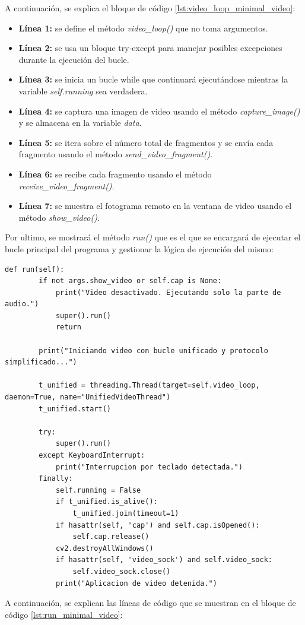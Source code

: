 \vspace{\baselineskip}
A continuación, se explica el bloque de código \ref{lst:video_loop_minimal_video}:
\vspace{\baselineskip}
\begin{itemize}
    \item \textbf{Línea 1:} se define el método \textit{video\_loop()} que no toma argumentos.
    \item \textbf{Línea 2:} se usa un bloque try-except para manejar posibles excepciones durante la ejecución del bucle.
    \item \textbf{Línea 3:} se inicia un bucle while que continuará ejecutándose mientras la variable \textit{self.running} sea verdadera.
    \item \textbf{Línea 4:} se captura una imagen de video usando el método \textit{capture\_image()} y se almacena en la variable \textit{data}.
    \item \textbf{Línea 5:} se itera sobre el número total de fragmentos y se envía cada fragmento usando el método \textit{send\_video\_fragment()}.
    \item \textbf{Línea 6:} se recibe cada fragmento usando el método \textit{receive\_video\_fragment()}.
    \item \textbf{Línea 7:} se muestra el fotograma remoto en la ventana de video usando el método \textit{show\_video()}.
\end{itemize}

\vspace{\baselineskip}

Por ultimo, se mostrará el método \textit{run()} que es el que se encargará de ejecutar el bucle principal del programa y gestionar la lógica de ejecución del mismo:
\begin{lstlisting}[style=pythonstyle, caption={Método run() de \textit{Minimal\_Video}}, label={lst:run_minimal_video}]
def run(self):
        if not args.show_video or self.cap is None:
            print("Video desactivado. Ejecutando solo la parte de audio.")
            super().run()
            return

        print("Iniciando video con bucle unificado y protocolo simplificado...")

        t_unified = threading.Thread(target=self.video_loop, daemon=True, name="UnifiedVideoThread")
        t_unified.start()

        try:
            super().run()
        except KeyboardInterrupt:
            print("Interrupcion por teclado detectada.")
        finally:
            self.running = False
            if t_unified.is_alive():
                t_unified.join(timeout=1)
            if hasattr(self, 'cap') and self.cap.isOpened():
                self.cap.release()
            cv2.destroyAllWindows()
            if hasattr(self, 'video_sock') and self.video_sock:
                self.video_sock.close()
            print("Aplicacion de video detenida.")
\end{lstlisting}
\vspace{\baselineskip}
A continuación, se explican las líneas de código que se muestran en el bloque de código \ref{lst:run_minimal_video}:

